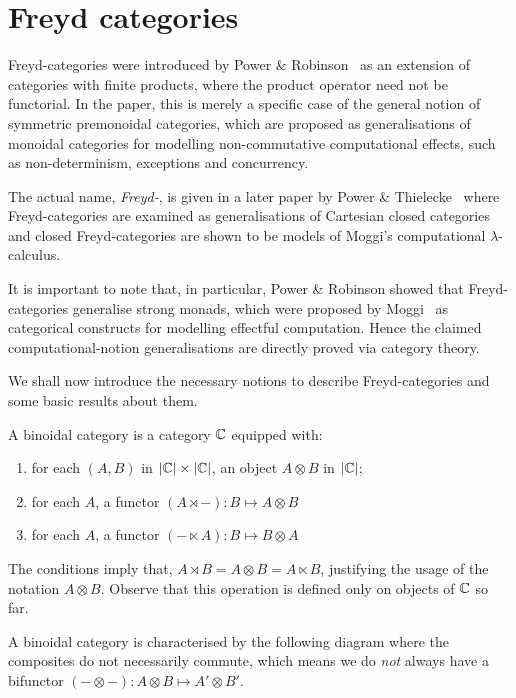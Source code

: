 \section{Freyd categories}

Freyd-categories were introduced by Power \& Robinson~\cite{pow-rob} as an
extension of categories with finite products, where the product operator
need not be functorial. In the paper, this is merely a specific case of the
general notion of symmetric premonoidal categories, which are proposed as
generalisations of monoidal categories for modelling non-commutative
computational effects, such as non-determinism, exceptions and concurrency.

The actual name, \emph{Freyd-}, is given in a later paper by Power \&
Thielecke~\cite{pow-thie} where Freyd-categories are examined as generalisations
of Cartesian closed categories and closed Freyd-categories are shown to be
models of Moggi's computational $\lambda$-calculus.

It is important to note that, in particular, Power \& Robinson showed that
Freyd-categories generalise strong monads, which were proposed by
Moggi~\cite{moggi-89} as categorical constructs for modelling effectful
computation. Hence the claimed computational-notion generalisations are
directly proved via category theory.

We shall now introduce the necessary notions to describe Freyd-categories and
some basic results about them.

\begin{definition}
    A binoidal category is a category $\mathbb{C}$ equipped with:
    \begin{enumerate}
        \item for each $(A, B)$ in $|\mathbb{C}| \times |\mathbb{C}|$, an object $A \otimes B$
            in $|\mathbb{C}|$;
        \item for each $A$, a functor $(A \rtimes -) : B \mapsto A \otimes B$
        \item for each $A$, a functor $(- \ltimes A) : B \mapsto B \otimes A$
    \end{enumerate}
\end{definition}

The conditions imply that, $A \rtimes B = A \otimes B = A \ltimes B$,
justifying the usage of the notation $A \otimes B$. Observe that this
operation is defined only on objects of $\mathbb{C}$ so far.

A binoidal category is characterised by the following diagram
\binoidaldiag
where the composites do not necessarily commute, which means we do \emph{not}
always have a bifunctor $(- \otimes -): A\otimes B \mapsto A' \otimes B'$.

